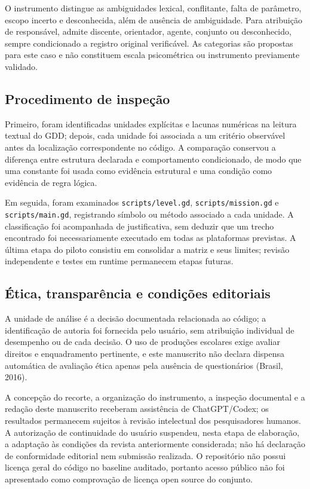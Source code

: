 O instrumento distingue as ambiguidades lexical, conflitante, falta de parâmetro, escopo incerto e desconhecida, além de ausência de ambiguidade. Para atribuição de responsável, admite discente, orientador, agente, conjunto ou desconhecido, sempre condicionado a registro original verificável. As categorias são propostas para este caso e não constituem escala psicométrica ou instrumento previamente validado.

\subsection{Procedimento de inspeção}
Primeiro, foram identificadas unidades explícitas e lacunas numéricas na leitura textual do GDD; depois, cada unidade foi associada a um critério observável antes da localização correspondente no código. A comparação conservou a diferença entre estrutura declarada e comportamento condicionado, de modo que uma constante foi usada como evidência estrutural e uma condição como evidência de regra lógica.

Em seguida, foram examinados \texttt{scripts/level.gd}, \texttt{scripts/mission.gd} e \texttt{scripts/main.gd}, registrando símbolo ou método associado a cada unidade. A classificação foi acompanhada de justificativa, sem deduzir que um trecho encontrado foi necessariamente executado em todas as plataformas previstas. A última etapa do piloto consistiu em consolidar a matriz e seus limites; revisão independente e testes em runtime permanecem etapas futuras.

\subsection{Ética, transparência e condições editoriais}
A unidade de análise é a decisão documentada relacionada ao código; a identificação de autoria foi fornecida pelo usuário, sem atribuição individual de desempenho ou de cada decisão. O uso de produções escolares exige avaliar direitos e enquadramento pertinente, e este manuscrito não declara dispensa automática de avaliação ética apenas pela ausência de questionários (Brasil, 2016).

A concepção do recorte, a organização do instrumento, a inspeção documental e a redação deste manuscrito receberam assistência de ChatGPT/Codex; os resultados permanecem sujeitos à revisão intelectual dos pesquisadores humanos. A autorização de continuidade do usuário suspendeu, nesta etapa de elaboração, a adaptação às condições da revista anteriormente considerada; não há declaração de conformidade editorial nem submissão realizada. O repositório não possui licença geral do código no baseline auditado, portanto acesso público não foi apresentado como comprovação de licença open source do conjunto.

